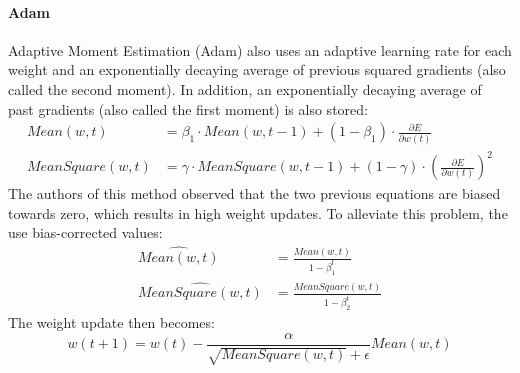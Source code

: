 \paragraph{Adam} %
\label{par:adam}
Adaptive Moment Estimation (Adam) \citep{DBLP:journals/corr/KingmaB14} also uses an adaptive learning rate for each weight and an exponentially decaying average of previous squared gradients (also called the second moment). In addition, an exponentially decaying average of past gradients (also called the first moment) is also stored:
\begin{subequations}
\label{eq:adam:means}
\begin{align}
    Mean(w,t) &= \beta_1 \cdot Mean(w,t-1) + (1-\beta_1)\cdot \frac{\partial E}{\partial w(t)}\\
    MeanSquare(w, t) &= \gamma \cdot MeanSquare(w, t-1) + (1 - \gamma) \cdot \left (\frac{\partial E}{\partial w(t)} \right )^2
\end{align}
\end{subequations}
The authors of this method observed that the two previous equations are biased towards zero, which results in high weight updates. To alleviate this problem, the use bias-corrected values:
\begin{subequations}
\label{eq:adam:means:corrected}
\begin{align}
    \widehat{Mean(w,t)} &= \frac{Mean(w,t)}{1-\beta_1^t}\\
    \widehat{MeanSquare(w,t)} &= \frac{MeanSquare(w,t)}{1-\beta_2^t}
\end{align}
\end{subequations}
The weight update then becomes:
\begin{equation}
    w(t+1) = w(t) - \frac{\alpha}{\sqrt{MeanSquare(w,t)} + \epsilon} Mean(w,t)
\end{equation}


